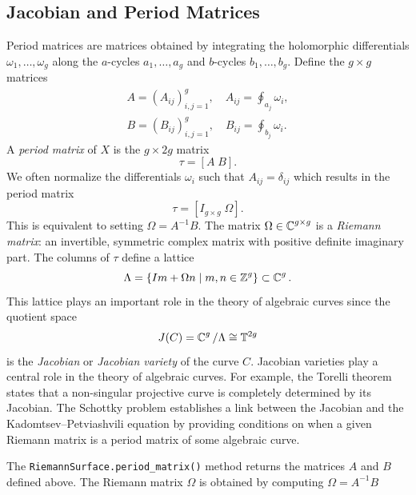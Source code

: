 \subsection{Jacobian and Period
  Matrices}\label{subsec:background-jacobian-and-period-matrices}

Period matrices are matrices obtained by integrating the holomorphic
differentials $\omega_1, \ldots, \omega_g$ along the $a$-cycles $a_1,\ldots,a_g$
and $b$-cycles $b_1,\ldots,b_g$. Define the $g \times g$ matrices
\begin{align*}
  A = \left( A_{ij} \right)_{i,j=1}^g,
  \quad A_{ij} = \oint_{a_j} \omega_i, \\
  B = \left( B_{ij} \right)_{i,j=1}^g,
  \quad B_{ij} = \oint_{b_j} \omega_i.
\end{align*}
A {\it period matrix} of $X$ is the $g \times 2g$ matrix
\[
  \tau = \left[ A \; B \right].
\]
We often normalize the differentials $\omega_i$ such that $A_{ij} = \delta_{ij}$
which results in the period matrix
\begin{equation} \label{eqn: period-matrix}
  \tau = \left[ I_{g \times g} \; \Omega \right].
\end{equation}
This is equivalent to setting $\Omega = A^{-1}B$. The matrix $\Omega \in \operatorname{\mathbb{C}}^{g
  \times g}$ is a {\it Riemann matrix}: an invertible, symmetric complex matrix
with positive definite imaginary part. The columns of $\tau$ define a lattice
\[
  \Lambda = \{I m + \Omega n \; | \; m,n \in \operatorname{\mathbb{Z}}^g\} \subset \operatorname{\mathbb{C}}^g.
\]
This lattice plays an important role in the theory of algebraic curves since the
quotient space
\begin{equation} \label{eqn: jacobian}
  J(C) = \operatorname{\mathbb{C}}^g / \Lambda \cong \mathbb{T}^{2g}
\end{equation}
is the {\it Jacobian} or {\it Jacobian variety} of the curve $C$. Jacobian
varieties play a central role in the theory of algebraic curves. For example,
the Torelli theorem \cite{Mumford99} states that a non-singular projective curve
is completely determined by its Jacobian. The Schottky problem establishes a
link between the Jacobian and the Kadomtsev--Petviashvili equation by providing
conditions on when a given Riemann matrix is a period matrix of some algebraic
curve.


The \verb=RiemannSurface.period_matrix()= method returns the matrices $A$ and
$B$ defined above. The Riemann matrix $\Omega$ is obtained by computing $\Omega
= A^{-1}B$


